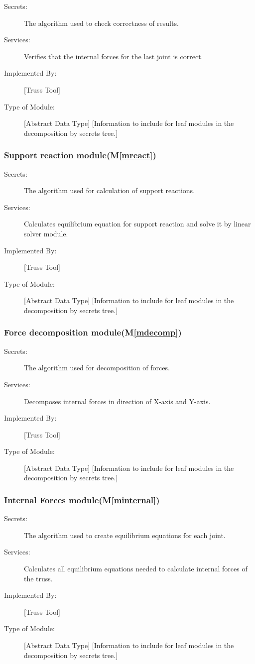 \documentclass[12pt, titlepage]{article}
\newcommand{\mref}[1]{M\ref{#1}}
\begin{document}
\begin{description}
\item[Secrets:]The algorithm used to check correctness of results.
\item[Services:] Verifies that the internal forces for the last joint is correct.
\item[Implemented By:] [Truss Tool]
\item[Type of Module:] [Abstract Data Type]
  [Information to include for leaf modules in the decomposition by secrets tree.]
\end{description}
\subsubsection{Support reaction module(\mref{mreact})}

\begin{description}
\item[Secrets:]The algorithm used for calculation of support reactions.
\item[Services:] Calculates equilibrium equation for support reaction and solve it by linear solver module.
\item[Implemented By:] [Truss Tool]
\item[Type of Module:] [Abstract Data Type]
  [Information to include for leaf modules in the decomposition by secrets tree.]
\end{description}
\subsubsection{Force decomposition module(\mref{mdecomp})}

\begin{description}
\item[Secrets:]The algorithm used for decomposition of forces.
\item[Services:] Decomposes internal forces in direction of X-axis and Y-axis.
\item[Implemented By:] [Truss Tool]
\item[Type of Module:] [Abstract Data Type]
  [Information to include for leaf modules in the decomposition by secrets tree.]
\end{description}
\subsubsection{Internal Forces module(\mref{minternal})}

\begin{description}
\item[Secrets:]The algorithm used to create equilibrium equations for each joint.
\item[Services:] Calculates all equilibrium equations needed to calculate internal forces of the truss. 
\item[Implemented By:] [Truss Tool]
\item[Type of Module:] [Abstract Data Type]
  [Information to include for leaf modules in the decomposition by secrets tree.]
\end{description}
\end{document}
